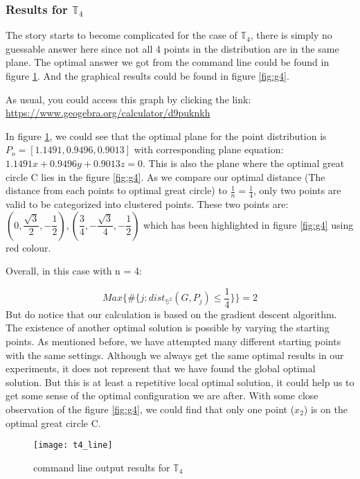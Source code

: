 \documentclass[12pt]{article}
\numberwithin{equation}{section}
\let\bb\mathbb
\let\bb\mathbb
\begin{document}
		\subsubsection{Results for $\bb{T}_4$}
			The story starts to become complicated for the case of $\bb{T}_4$, there is simply no guessable answer here since not all 4 points in the distribution are in the same plane. The optimal answer we got from the command line could be found in figure \ref{fig:c4}. And the graphical results could be found in figure \ref{fig:g4}.\par 
			As usual, you could access this graph by clicking the link: \url{https://www.geogebra.org/calculator/d9puknkh} \par 
			In figure \ref{fig:c4}, we could see that the optimal plane for the point distribution is $P_o = [1.1491, 0.9496, 0.9013]$ with corresponding plane equation: $1.1491x+0.9496y+0.9013z=0$. This is also the plane where the optimal great circle C lies in the figure \ref{fig:g4}. As we compare our optimal distance (The distance from each points to optimal great circle) to $\frac{1}{n} = \frac{1}{4}$, only two points are valid to be categorized into clustered points. These two points are: $(0, \dfrac{\sqrt{3}}{2}, 	-\dfrac{1}{2}) , (\dfrac{3}{4}, -\dfrac{\sqrt{3}}{4}, -\dfrac{1}{2})$ which has been highlighted in figure \ref{fig:g4} using red colour.\par 
			Overall, in this case with n = 4:
			
			\[ Max \{\#  \{ j:dist_{{\bb{S}}^2} (G, P_j)\leq \dfrac{1}{4} \}\} = 2\]
			But do notice that our calculation is based on the gradient descent algorithm. The existence of another optimal solution is possible by varying the starting points. As mentioned before, we have attempted many different starting points with the same settings. Although we always get the same optimal results in our experiments, it does not represent that we have found the global optimal solution. But this is at least a repetitive local optimal solution, it could help us to get some sense of the optimal configuration we are after. 
			With some close observation of the figure \ref{fig:g4}, we could find that only one point ($x_2$) is on the optimal great circle C.
			
		
		\begin{figure}
			\centering
			\texttt{[image: t4\_line]}
			\caption{command line output results for $\bb{T}_4$ }
			\label{fig:c4}
		\end{figure}
		
\end{document}
